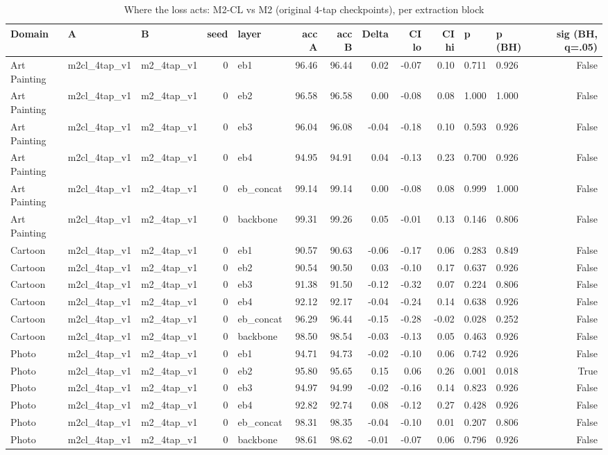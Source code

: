 \begin{table}
\caption{Where the loss acts: M2-CL vs M2 (original 4-tap checkpoints), per extraction block}
\label{tab:leak_cl_effect_at_taps_v1}
\begin{tabular}{lllrlrrrrrllr}
\toprule
Domain & A & B & seed & layer & acc A & acc B & Delta & CI lo & CI hi & p & p (BH) & sig (BH, q=.05) \\
\midrule
Art Painting & m2cl\_4tap\_v1 & m2\_4tap\_v1 & 0 & eb1 & 96.46 & 96.44 & 0.02 & -0.07 & 0.10 & 0.711 & 0.926 & False \\
Art Painting & m2cl\_4tap\_v1 & m2\_4tap\_v1 & 0 & eb2 & 96.58 & 96.58 & 0.00 & -0.08 & 0.08 & 1.000 & 1.000 & False \\
Art Painting & m2cl\_4tap\_v1 & m2\_4tap\_v1 & 0 & eb3 & 96.04 & 96.08 & -0.04 & -0.18 & 0.10 & 0.593 & 0.926 & False \\
Art Painting & m2cl\_4tap\_v1 & m2\_4tap\_v1 & 0 & eb4 & 94.95 & 94.91 & 0.04 & -0.13 & 0.23 & 0.700 & 0.926 & False \\
Art Painting & m2cl\_4tap\_v1 & m2\_4tap\_v1 & 0 & eb\_concat & 99.14 & 99.14 & 0.00 & -0.08 & 0.08 & 0.999 & 1.000 & False \\
Art Painting & m2cl\_4tap\_v1 & m2\_4tap\_v1 & 0 & backbone & 99.31 & 99.26 & 0.05 & -0.01 & 0.13 & 0.146 & 0.806 & False \\
Cartoon & m2cl\_4tap\_v1 & m2\_4tap\_v1 & 0 & eb1 & 90.57 & 90.63 & -0.06 & -0.17 & 0.06 & 0.283 & 0.849 & False \\
Cartoon & m2cl\_4tap\_v1 & m2\_4tap\_v1 & 0 & eb2 & 90.54 & 90.50 & 0.03 & -0.10 & 0.17 & 0.637 & 0.926 & False \\
Cartoon & m2cl\_4tap\_v1 & m2\_4tap\_v1 & 0 & eb3 & 91.38 & 91.50 & -0.12 & -0.32 & 0.07 & 0.224 & 0.806 & False \\
Cartoon & m2cl\_4tap\_v1 & m2\_4tap\_v1 & 0 & eb4 & 92.12 & 92.17 & -0.04 & -0.24 & 0.14 & 0.638 & 0.926 & False \\
Cartoon & m2cl\_4tap\_v1 & m2\_4tap\_v1 & 0 & eb\_concat & 96.29 & 96.44 & -0.15 & -0.28 & -0.02 & 0.028 & 0.252 & False \\
Cartoon & m2cl\_4tap\_v1 & m2\_4tap\_v1 & 0 & backbone & 98.50 & 98.54 & -0.03 & -0.13 & 0.05 & 0.463 & 0.926 & False \\
Photo & m2cl\_4tap\_v1 & m2\_4tap\_v1 & 0 & eb1 & 94.71 & 94.73 & -0.02 & -0.10 & 0.06 & 0.742 & 0.926 & False \\
Photo & m2cl\_4tap\_v1 & m2\_4tap\_v1 & 0 & eb2 & 95.80 & 95.65 & 0.15 & 0.06 & 0.26 & 0.001 & 0.018 & True \\
Photo & m2cl\_4tap\_v1 & m2\_4tap\_v1 & 0 & eb3 & 94.97 & 94.99 & -0.02 & -0.16 & 0.14 & 0.823 & 0.926 & False \\
Photo & m2cl\_4tap\_v1 & m2\_4tap\_v1 & 0 & eb4 & 92.82 & 92.74 & 0.08 & -0.12 & 0.27 & 0.428 & 0.926 & False \\
Photo & m2cl\_4tap\_v1 & m2\_4tap\_v1 & 0 & eb\_concat & 98.31 & 98.35 & -0.04 & -0.10 & 0.01 & 0.207 & 0.806 & False \\
Photo & m2cl\_4tap\_v1 & m2\_4tap\_v1 & 0 & backbone & 98.61 & 98.62 & -0.01 & -0.07 & 0.06 & 0.796 & 0.926 & False \\
\bottomrule
\end{tabular}
\end{table}
